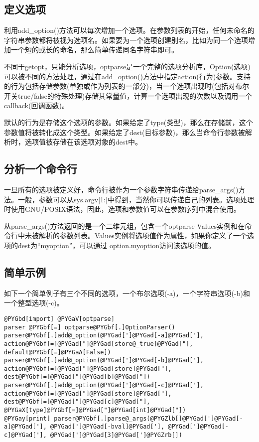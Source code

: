 \documentclass[letterpaper,10pt,english]{manual}
\begin{document}
\subsection{定义选项}

利用add\_option()方法可以每次增加一个选项。在参数列表的开始，任何未命名的字符串参数都将被视为选项名。如果要为一个选项创建别名，比如为同一个选项增加一个短的或长的命名，那么简单传递同名字符串即可。

不同于getopt，只能分析选项，optparse是一个完整的选项分析库，Option(选项)可以被不同的方法处理，通过在add\_option()方法中指定action(行为)参数。支持的行为包括存储参数(单独或作为列表的一部分)，当一个选项出现时(包括对布尔开关true/false的特殊处理)存储其常量值，计算一个选项出现的次数以及调用一个callback(回调函数)。

默认的行为是存储这个选项的参数。如果给定了type(类型)，那么在存储前，这个参数值将被转化成这个类型。如果给定了dest(目标参数)，那么当命令行参数被解析时，选项值被存储在该选项对象的dest中。


\subsection{分析一个命令行}

一旦所有的选项被定义好，命令行被作为一个参数字符串传递给parse\_args()方法。一般，参数可以从sys.argv{[}1:{]}中得到，当然你可以传递自己的列表。选项处理时使用GNU/POSIX语法，因此，选项和参数值可以在参数序列中混合使用。

从parse\_args()方法返回的是一个二维元组，包含一个optparse Values实例和在命令行中未被解析的参数列表。Values实例将选项值作为属性，如果你定义了一个选项的dest为“myoption”，可以通过 option.myoption访问该选项的值。


\subsection{简单示例}

如下一个简单例子有三个不同的选项，一个布尔选项(-a)，一个字符串选项(-b)和一个整型选项(-c)。

\begin{Verbatim}[commandchars=@\[\]]
@PYGbd[import] @PYGaV[optparse]
parser @PYGbf[=] optparse@PYGbf[.]OptionParser()
parser@PYGbf[.]add@_option(@PYGad[']@PYGad[-a]@PYGad['], action@PYGbf[=]@PYGad["]@PYGad[store@_true]@PYGad["], default@PYGbf[=]@PYGaA[False])
parser@PYGbf[.]add@_option(@PYGad[']@PYGad[-b]@PYGad['], action@PYGbf[=]@PYGad["]@PYGad[store]@PYGad["], dest@PYGbf[=]@PYGad["]@PYGad[b]@PYGad["])
parser@PYGbf[.]add@_option(@PYGad[']@PYGad[-c]@PYGad['], action@PYGbf[=]@PYGad["]@PYGad[store]@PYGad["], dest@PYGbf[=]@PYGad["]@PYGad[c]@PYGad["], @PYGaX[type]@PYGbf[=]@PYGad["]@PYGad[int]@PYGad["])
@PYGay[print] parser@PYGbf[.]parse@_args(@PYGZlb[]@PYGad[']@PYGad[-a]@PYGad['], @PYGad[']@PYGad[-bval]@PYGad['], @PYGad[']@PYGad[-c]@PYGad['], @PYGad[']@PYGad[3]@PYGad[']@PYGZrb[])
\end{Verbatim}
\end{document}
